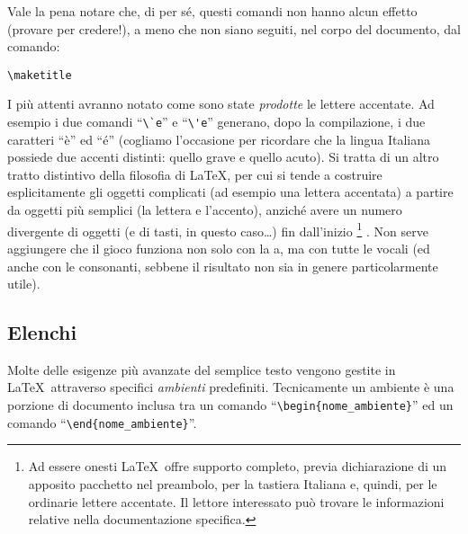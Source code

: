 Vale la pena notare che, di per s\'e,  questi comandi non hanno alcun effetto
(provare per credere!), a meno che non siano seguiti, nel corpo del documento,
dal comando:
\begin{verbatim}
\maketitle
\end{verbatim}

I pi\`u attenti avranno notato come sono state \emph{prodotte} le lettere
accentate. Ad esempio i due comandi ``\verb|\`e|'' e ``\verb|\'e|'' generano,
dopo la compilazione, i due caratteri ``\`e'' ed ``\'e'' (cogliamo l'occasione
per ricordare che la lingua Italiana possiede due accenti distinti: quello
grave e quello acuto).
Si tratta di un altro tratto distintivo della filosofia di \LaTeX, per cui si
tende a costruire esplicitamente gli oggetti complicati (ad esempio una
lettera accentata) a partire da oggetti pi\`u semplici (la lettera e
l'accento), anzich\'e avere un numero divergente di oggetti (e di tasti,
in questo caso\ldots) fin dall'inizio%
\footnote{
Ad essere onesti \LaTeX\ offre supporto completo, previa dichiarazione di un
apposito pacchetto nel preambolo, per la tastiera Italiana e, quindi, per le
ordinarie lettere accentate. Il lettore interessato pu\`o trovare le
informazioni relative nella documentazione specifica.
}%
.
Non serve aggiungere che il gioco funziona non solo con la a, ma con tutte le
vocali (ed anche con le consonanti, sebbene il risultato non sia in genere
particolarmente utile).


\subsection{Elenchi}

Molte delle esigenze pi\`u avanzate del semplice testo vengono gestite
in \LaTeX\ attraverso specifici \emph{ambienti} predefiniti.
Tecnicamente un ambiente \`e una porzione di documento inclusa tra un comando
``\verb|\begin{nome_ambiente}|'' ed un comando ``\verb|\end{nome_ambiente}|''.

